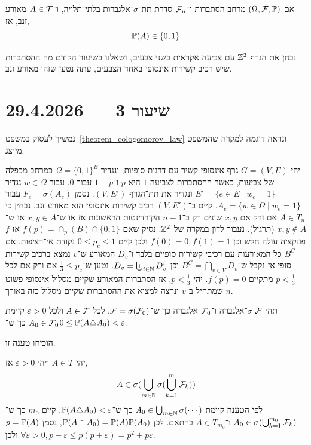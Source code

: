 \begin{theorem}\label{theorem_cologomorov_law}
	אם $(\Omega, \mathcal{F}, \mathbb{P})$ מרחב הסתברות ו־$\mathcal{F}_n$ סדרת תת־$\sigma$־אלגברות בלתי־תלויה, ו־$A \in \mathcal{T}$ מאורע זנב, אז,
	\[
		\mathbb{P}(A) \in \{0, 1\}
	\]
\end{theorem}
\begin{example}
	נבחן את הגרף $\mathbb{Z}^2$ עם צביעה אקראית בשני צבעים, ושאלנו בשיעור הקודם מה ההסתברות שיש רכיב קשירות אינסופי באחד הצבעים,
	עתה נטען שזהו מאורע זנב.
\end{example}

\section{שיעור 3 --- 29.4.2026}
נמשיך לעסוק במשפט\ \ref{theorem_cologomorov_law} ונראה דוגמה למקרה שהמשפט מייצג.
\begin{example}
	יהי $G = (V, E)$ גרף אינסופי קשיר עם דרגות סופיות, ונגדיר $\Omega = {\{ 0, 1 \}}^E$ כמרחב מכפלה של צביעות, כאשר ההסתברות לצביעה $1$ היא $p$ ו־$1 - p$ עבור $0$.
	עבור $w \in \Omega$ נגדיר $E' = \{ e \in E \mid w_e = 1 \}$ ונגדיר את תת־הגרף $(V, E')$.
	נסמן $F_e = \sigma(A_e)$ עבור $A_e = \{ w \in \Omega \mid w_e = 1 \}$.
	קיים ב־$(V, E')$ רכיב קשירות אינסופי הוא מאורע זנב.
	נבחין כי $A \in T_n$ אם ורק אם $x, y$ שונים רק ב־$n - 1$ הקורדינטות הראשונות אז או ש־$x, y \in A$ או ש־$x, y \notin A$ (תרגיל).
	נעבור לדון במקרה של $\mathbb{Z}^2$.
	נסיק שאם $f(p) = \cap_p(B) \cap \{0, 1\}$ אז $f$ פונקציה עולה חלש וכן $f(0) = 0, f(1) = 1$ ולכן קיים $0 \le p_c \le 1$ נקודת אי־רציפות.
	אם $B^C$ כל המאורעות עם רכיבי קשירות סופיים בלבד ו־$D_v$ המאורע ש־$v$ נמצא ברכיב קשירות סופי אז נקבל ש־$B^C = \bigcap_{v \in V} D_v$ וכן $D_v = \biguplus_{i \in \mathbb{N}} D_v^i$.
	נטען ש־$\frac{1}{3} \le p_c$ אם ורק אם לכל $p < \frac{1}{3}$ מתקיים $f(p) = 0$.
	יהי $p < \frac{1}{3}$, אז הסתברות המאורע שקיים מסלול אינסופי פשוט שמתחיל ב־$v$ ונרצה למצוא את ההסתברות שקיים מסלול כזה באורך $n$.
\end{example}
\begin{proposition}
	תהי $\mathcal{F}$ $\sigma$־אלגברה ו־$\mathcal{F}_0$ אלגברה כך ש־$\mathcal{F} = \sigma(\mathcal{F}_0)$.
	לכל $A \in \mathcal{F}$ ולכל $\varepsilon > 0$ קיימת $A_0 \in \mathcal{F}_0$ כך ש־$0 \le \mathbb{P}(A \triangle A_0) < \varepsilon$.
\end{proposition}
\begin{exercise}
	הוכיחו טענה זו.
\end{exercise}
יהי $A \in T$ ויהי $\varepsilon > 0$ אז,
\[
	A \in \sigma(\bigcup_{m \in \mathbb{N}} \sigma(\bigcup_{k = 1}^m \mathcal{F}_k))
\]
לפי הטענה קיימת $A_0 \in \bigcup_{m \in \mathbb{N}} \sigma(\cdots)$ כך ש־$\mathbb{P}(A \triangle A_0) < \varepsilon$.
קיים $m_0$ כך ש־$A_0 \in \sigma(\bigcup_{k = 1}^{m_0} \mathcal{F}_k)$ ו־$A \in T_{m_0}$ בהתאם.
לכן $\mathbb{P}(A \cap A_0) = \mathbb{P}(A) \mathbb{P}(A_0)$, נסמן $p = \mathbb{P}(A)$ ולכן $\forall \varepsilon > 0, p - \varepsilon \le p(p + \varepsilon) = p^2 + p \varepsilon$.

